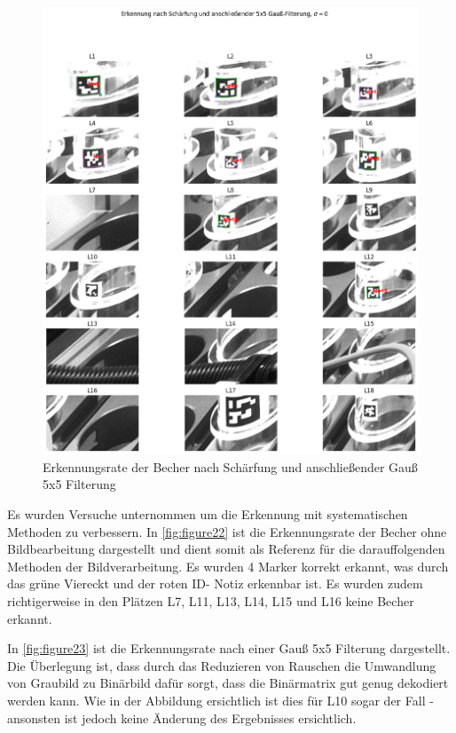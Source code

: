     \begin{figure}
        \caption[Erkennungsrate der Becher nach Schärfung und Gauß 5x5 Filterung]{Erkennungsrate der Becher nach Schärfung und anschließender Gauß 5x5 Filterung}\label{fig:figure26}
        \includegraphics[width = \textwidth]{Bilder/ErkennungsrateScharfGauss.png}
        \centering
    \end{figure}

    Es wurden Versuche unternommen um die Erkennung mit systematischen Methoden zu verbessern.
    In \ref{fig:figure22} ist die Erkennungsrate der Becher ohne Bildbearbeitung dargestellt und dient somit als Referenz für die darauffolgenden Methoden der Bildverarbeitung.
    Es wurden 4 Marker korrekt erkannt, was durch das grüne Viereckt und der roten ID- Notiz erkennbar ist. 
    Es wurden zudem richtigerweise in den Plätzen L7, L11, L13, L14, L15 und L16 keine Becher erkannt.

    In \ref{fig:figure23} ist die Erkennungsrate nach einer Gauß 5x5 Filterung dargestellt. 
    Die Überlegung ist, dass durch das Reduzieren von Rauschen die Umwandlung von Graubild zu Binärbild dafür sorgt, dass die Binärmatrix gut genug dekodiert werden kann. 
    Wie in der Abbildung ersichtlich ist dies für L10 sogar der Fall - ansonsten ist jedoch keine Änderung des Ergebnisses ersichtlich.

